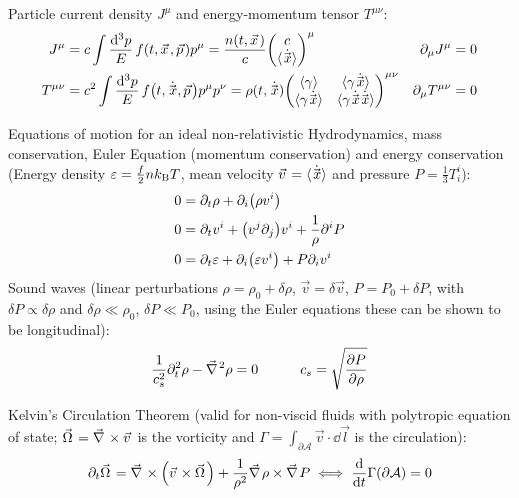 			\noindent
			Particle current density $J^\mu$ and energy-momentum tensor $T^{\mu\nu}$:
			\begin{align}
				J^{\mu} &= c \int \frac{\dd[3] p}{E}\, f\qty(t, \vec{x}, \vec{p}) p^{\mu} = \frac{n(t, \vec{x})}{c} \mqty(c\\\avg{\dot{\vec{x}}})^\mu
				&
				\partial_\mu J^{\mu} &= 0 \\
				T^{\mu\nu} &= c^2 \int \frac{\dd[3] p}{E}\, f\qty(t, \dot{\vec{x}}, \vec{p}) p^{\mu} p^{\nu} =\rho(t, \dot{\vec{x}})\mqty(\avg{\gamma} & \avg{\gamma \dot{\vec{x}}} \\ \avg{\gamma \dot{\vec{x}}} & \avg{\gamma\dot{\vec{x}}\dot{\vec{x}}})^{\mu\nu}
				&
				\partial_\mu T^{\mu\nu} &= 0
			\end{align}

			\noindent
			Equations of motion for an ideal non-relativistic Hydrodynamics, \ie mass conservation, Euler Equation (momentum conservation) and energy conservation (Energy density $\varepsilon=\frac{f}{2} n k_{\text{B}} T$, mean velocity $\vec{v}=\avg{\dot{\vec{x}}}$ and pressure $P = \frac{1}{3} T^{i}_i$):
			\begin{align}
				0 &= \partial_t \rho + \partial_i \qty(\rho v^i) \\
				0 &= \partial_t v^i + \qty(v^j \partial_j) v^i + \frac{1}{\rho} \partial^i P \\
				0 &= \partial_t \varepsilon + \partial_i \qty(\varepsilon v^i) + P \partial_i v^i
			\end{align}
			\noindent
			Sound waves (linear perturbations $\rho = \rho_0 + \delta \rho$, $\vec{v} = \delta \vec{v}$, $P = P_0 + \delta P$, with $\delta P \propto \delta \rho$ and $\delta \rho \ll \rho_0$, $\delta P \ll P_0$, using the Euler equations these can be shown to be longitudinal):
			\begin{equation}
				\frac{1}{c_s^2} \partial_t^2 \rho - \Nabla^2 \rho = 0 \hsp c_s = \sqrt{\frac{\partial P}{\partial \rho}}
			\end{equation}

			\noindent
			Kelvin's Circulation Theorem (valid for non-viscid fluids with polytropic equation of state; $\vec{\Omega} = \Nabla \times \vec{v}$ is the vorticity and $\Gamma = \int_{\partial \mathcal{A}} \vec{v} \cdot \dd \vec{l}$ is the circulation):
			\begin{equation}
				\partial_t \vec{\Omega} = \Nabla \times \qty(\vec{v} \times \vec{\Omega}) + \frac{1}{\rho^2} \Nabla \rho \times \Nabla P
				\iff \dv{t}\Gamma(\partial \mathcal{A}) = 0
			\end{equation}

